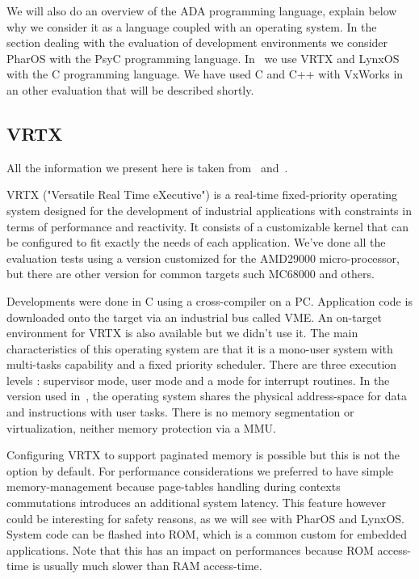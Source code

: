 \documentclass[10pt]{report}
\begin{document}
We will also do an overview of the ADA programming language,
explain below why we consider it as a language coupled with an
operating system. In the section dealing with the evaluation of development
environments we consider PharOS with the PsyC programming language. 
In~\cite{Delchini:95} we use VRTX and LynxOS with the C programming language. 
We have used C and C++ with VxWorks in an other evaluation that will be described shortly.

\subsection{VRTX}

All the information we present here is taken from~\cite{VRTX:90} and~\cite{AMD29000:91}.

VRTX ("Versatile Real Time eXecutive") is a real-time fixed-priority 
operating system designed for the development of industrial applications
with constraints in terms of performance and reactivity. 
It consists of a customizable kernel that can be
configured to fit exactly the needs of each application. We've done all
the evaluation tests using a version customized for the AMD29000
micro-processor, but there are other version for common targets
such MC68000 and others.

Developments were done in C using a cross-compiler on a PC.
Application code is downloaded onto the target via an industrial
bus called VME. An on-target environment for VRTX is also
available but we didn't use it. The main characteristics of this
operating system are that it is a mono-user system with multi-tasks
capability and a fixed priority scheduler. There are three
execution levels : supervisor mode, user mode and a mode for
interrupt routines. In the version used in~\cite{Delchini:95}, the
operating system shares the physical address-space for data and
instructions with user tasks. There is no memory segmentation or virtualization, 
neither memory protection via a MMU.

Configuring VRTX to support paginated memory is possible but this
is not the option by default. For performance considerations we
preferred to have simple memory-management because page-tables
handling during contexts commutations introduces an additional
system latency. This feature however could be interesting for
safety reasons, as we will see with PharOS and LynxOS. System code
can be flashed into ROM, which is a common custom for embedded
applications. Note that this has an impact on performances
because ROM access-time is usually much slower than RAM access-time.
\end{document}

